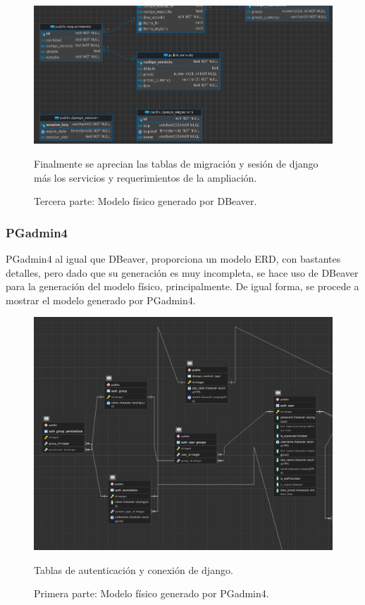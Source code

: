 \documentclass[
  12pt,
  hidelinks,
  a4paper,
  headings=standardclasses,
  headings=big,
  spanish
]{scrartcl}
\begin{document}
\begin{figure}[H]
  \centering
  \includegraphics[width=1\textwidth]{dbeaver-3.png}
  \caption{Tercera parte: Modelo físico generado por DBeaver.}
  \medskip
  \small
  Finalmente se aprecian las tablas de migración y sesión de django más los servicios y requerimientos de la ampliación.
\end{figure}

\pagebreak
\subsubsection{PGadmin4}

PGadmin4 al igual que DBeaver, proporciona un modelo ERD, con bastantes detalles, pero dado que su generación es muy incompleta, se hace uso de DBeaver para la generación del modelo físico, principalmente. De igual forma, se procede a mostrar el modelo generado por PGadmin4.

\begin{figure}[H]
  \centering
  \includegraphics[width=1\textwidth]{pgadmin-1.png}
  \caption{Primera parte: Modelo físico generado por PGadmin4.}
  \medskip
  \small
  Tablas de autenticación y conexión de django.
\end{figure}
\end{document}
